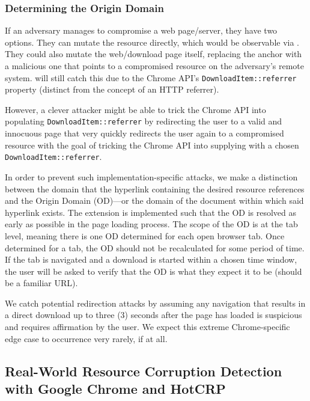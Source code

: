 \subsubsection{Determining the Origin Domain}

If an adversary manages to compromise a web page/server, they have two options.
They can mutate the resource directly, which would be observable via \SYSTEM{}.
They could also mutate the web/download page itself, replacing the anchor with a
malicious one that points to a compromised resource on the adversary's remote
system. \SYSTEM{} will still catch this due to the Chrome API's
\texttt{DownloadItem::referrer} property (distinct from the concept of an HTTP
referrer).

However, a clever attacker might be able to trick the Chrome API into populating
\texttt{DownloadItem::referrer} by redirecting the user to a valid and innocuous
page that very quickly redirects the user again to a compromised resource with
the goal of tricking the Chrome API into supplying \SYSTEM{} with a chosen
\texttt{DownloadItem::referrer}.

In order to prevent such implementation-specific attacks, we make a distinction
between the domain that the hyperlink containing the desired resource references
and the Origin Domain (OD)---or the domain of the document within which said
hyperlink exists. The extension is implemented such that the OD is resolved as
early as possible in the page loading process. The scope of the OD is at the tab
level, meaning there is one OD determined for each open browser tab. Once
determined for a tab, the OD should not be recalculated for some period of time.
If the tab is navigated and a download is started within a chosen time window,
the user will be asked to verify that the OD is what they expect it to be
(should be a familiar URL).

We catch potential redirection attacks by assuming any navigation that results
in a direct download up to three (3) seconds after the page has loaded is
suspicious and requires affirmation by the user. We expect this extreme
Chrome-specific edge case to occurrence very rarely, if at all.

\subsection{Real-World Resource Corruption Detection with Google Chrome and HotCRP}


